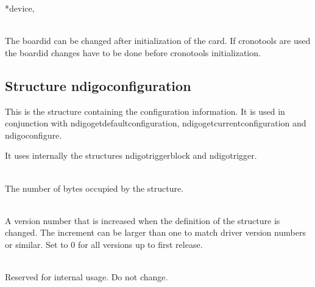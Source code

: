         \newline {}\par

        \newline {}\par

         {*device,} \par

         \\
        The \textsf{board\tu id} can be changed after initialization of the card. If cronotools are used the \textsf{board\tu id} changes have to be done before cronotools initialization.

        \subsection{Structure ndigo\tu configuration}

            This is the structure containing the configuration information. It is used in conjunction with \textsf{ndigo\tu get\tu default\tu configuration}, \textsf{ndigo\tu get\tu current\tu configuration} and \textsf{ndigo\tu configure}.\par

            It uses internally the structures \textsf{ndigo\tu trigger\tu block} and \textsf{ndigo\tu trigger}.\par

            \\
            The number of bytes occupied by the structure.\par

            \\
            A version number that is increased when the definition of the structure is changed. The increment can be larger than one to match driver version numbers or similar. Set to 0 for all versions up to first release.\par

            \\
            Reserved for internal usage. Do not change.\par


